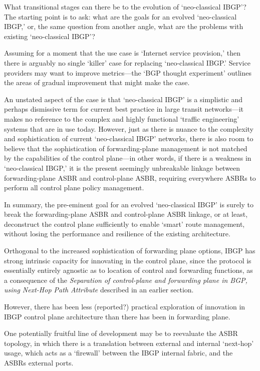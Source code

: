 What transitional stages can there be to the evolution of `neo-classical IBGP'? The starting point is to ask: what are the goals for an evolved `neo-classical IBGP,' or, the same question from another angle, what are the problems with existing `neo-classical IBGP'?

Assuming for a moment that the use case is `Internet service provision,' then there is arguably no single `killer' case for replacing `neo-classical IBGP.' Service providers may want to improve metrics—the `BGP thought experiment' outlines the areas of gradual improvement that might make the case.

An unstated aspect of the case is that `neo-classical IBGP' is a simplistic and perhaps dismissive term for current best practice in large transit networks—it makes no reference to the complex and highly functional `traffic engineering' systems that are in use today. However, just as there is nuance to the complexity and sophistication of current `neo-classical IBGP' networks, there is also room to believe that the sophistication of forwarding-plane management is not matched by the capabilities of the control plane—in other words, if there is a weakness in `neo-classical IBGP,' it is the present seemingly unbreakable linkage between forwarding-plane ASBR and control-plane ASBR, requiring everywhere ASBRs to perform all control plane policy management.

In summary, the pre-eminent goal for an evolved `neo-classical IBGP' is surely to break the forwarding-plane ASBR and control-plane ASBR linkage, or at least, deconstruct the control plane sufficiently to enable `smart' route management, without losing the performance and resilience of the existing architecture.
\medskip

Orthogonal to the increased sophistication of forwarding plane options, IBGP has strong intrinsic capacity for innovating in the control plane, since the protocol is essentially entirely agnostic as to location of control and forwarding functions, as a consequence of the  \textit{Separation of control-plane and forwarding plane in BGP, using Next-Hop Path Attribute}
described in an earlier section.

However, there has been less (reported?) practical exploration of innovation in IBGP control plane architecture than there has been in forwarding plane.

\medskip

One potentially fruitful line of development may be to reevaluate the ASBR topology, in which there is a translation between external and internal `next-hop' usage, which acts as a `firewall' between the IBGP internal fabric, and the ASBRs external ports.

